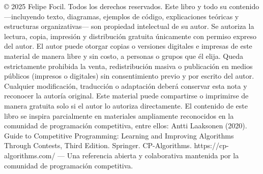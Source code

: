 \markdownRendererDocumentBegin
{}\markdownRendererSectionBegin
{}\markdownRendererInterblockSeparator
{}© 2025 Felipe Focil. Todos los derechos reservados.\markdownRendererParagraphSeparator
{}Este libro y todo su contenido —incluyendo texto, diagramas, ejemplos de código, explicaciones teóricas y estructuras organizativas— son propiedad intelectual de su autor.\markdownRendererParagraphSeparator
{}Se autoriza la lectura, copia, impresión y distribución gratuita únicamente con permiso expreso del autor.\markdownRendererSoftLineBreak
{}El autor puede otorgar copias o versiones digitales e impresas de este material de manera libre y sin costo, a personas o grupos que él elija.\markdownRendererParagraphSeparator
{}Queda estrictamente prohibida la venta, redistribución masiva o publicación en medios públicos (impresos o digitales) sin consentimiento previo y por escrito del autor. Cualquier modificación, traducción o adaptación deberá conservar esta nota y reconocer la autoría original.\markdownRendererParagraphSeparator
{}Este material puede compartirse o imprimirse de manera gratuita solo si el autor lo autoriza directamente.\markdownRendererInterblockSeparator
{}\markdownRendererSectionBegin
{}\markdownRendererInterblockSeparator
{}El contenido de este libro se inspira parcialmente en materiales ampliamente reconocidos en la comunidad de programación competitiva, entre ellos:\markdownRendererParagraphSeparator
{}Antti Laaksonen (2020). Guide to Competitive Programming: Learning and Improving Algorithms Through Contests, Third Edition. Springer.\markdownRendererParagraphSeparator
{}CP-Algorithms. https://cp-algorithms.com/\markdownRendererSoftLineBreak
{}— Una referencia abierta y colaborativa mantenida por la comunidad de programación competitiva.\markdownRendererInterblockSeparator
{}
